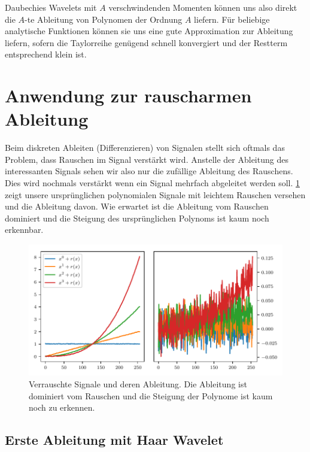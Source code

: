 \begin{refsection}
Daubechies Wavelets mit $A$ verschwindenden Momenten können uns also direkt die
$A$-te Ableitung von Polynomen der Ordnung $A$ liefern. Für beliebige
analytische Funktionen können sie uns eine gute Approximation zur Ableitung
liefern, sofern die Taylorreihe genügend schnell konvergiert und der Restterm
entsprechend klein ist.

\section{Anwendung zur rauscharmen Ableitung}

Beim diskreten Ableiten (Differenzieren) von Signalen stellt sich oftmals das
Problem, dass Rauschen im Signal verstärkt wird. Anstelle der Ableitung des
interessanten Signals sehen wir also nur die zufällige Ableitung des Rauschens.
Dies wird nochmals verstärkt wenn ein Signal mehrfach abgeleitet werden soll.
\cref{polynomials:noise:signals} zeigt unsere ursprünglichen polynomialen
Signale mit leichtem Rauschen versehen und die Ableitung davon. Wie erwartet
ist die Ableitung vom Rauschen dominiert und die Steigung des ursprünglichen
Polynoms ist kaum noch erkennbar.

\begin{figure}
    \centering
    \includegraphics{papers/polynomials/images/polynomials_noise_signals.pdf}
    \caption{Verrauschte Signale und deren Ableitung. Die Ableitung ist
             dominiert vom Rauschen und die Steigung der Polynome ist kaum noch
             zu erkennen.\label{polynomials:noise:signals}}
\end{figure}

\subsection{Erste Ableitung mit Haar Wavelet}


\end{refsection}
